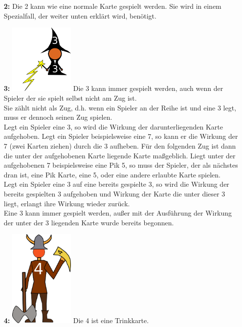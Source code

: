 \documentclass{article}
\begin{document}
       
\begin{itemize}
\item[\textbf{2:}]
Die 2 kann wie eine normale Karte gespielt werden. Sie wird in einem Spezialfall, der weiter unten erklärt wird, benötigt.
\item[\textbf{3:}]
\includegraphics[width=0.25\textwidth]{photos/Zauberer.png}
Die 3 kann immer gespielt werden, auch wenn der Spieler der sie spielt selbst nicht am Zug ist. \\ Sie zählt nicht als Zug, d.h. wenn ein Spieler an der Reihe ist und eine 3 legt, muss er dennoch seinen Zug spielen. \\
Legt ein Spieler eine 3, so wird die Wirkung der darunterliegenden Karte aufgehoben. Legt ein Spieler beispielsweise eine 7, so kann er die Wirkung der 7 (zwei Karten ziehen) durch die 3 aufheben. Für den folgenden Zug ist dann die
unter der aufgehobenen Karte liegende Karte maßgeblich. Liegt unter der aufgehobenen 7 beispielsweise eine Pik 5, so muss der Spieler, der als nächstes dran ist, eine Pik Karte, eine 5, oder eine andere erlaubte Karte spielen. \\
Legt ein Spieler eine 3 auf eine bereits gespielte 3, so wird die Wirkung der bereits gespielten 3 aufgehoben und Wirkung der Karte die unter dieser 3 liegt, erlangt ihre Wirkung wieder zurück. \\ Eine 3 kann immer gespielt werden, außer mit der Ausführung der Wirkung der unter der 3 liegenden Karte wurde bereits begonnen.
\item[\textbf{4:}]
\includegraphics[width=0.25\textwidth]{photos/Wikinger.png}
                 Die 4 ist eine Trinkkarte. \\

\end{itemize}
\end{document}
